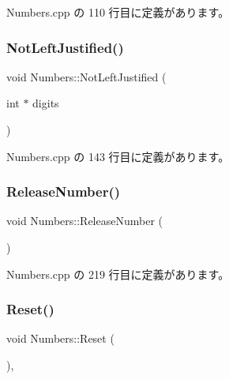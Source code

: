 Numbers.\+cpp の 110 行目に定義があります。

\mbox{\label{class_numbers_a1aaad1f057da0064766bfd25d57caa17}} 
\subsubsection{\texorpdfstring{Not\+Left\+Justified()}{NotLeftJustified()}}
{\footnotesize\ttfamily void Numbers\+::\+Not\+Left\+Justified (\begin{DoxyParamCaption}\item[{int $\ast$}]{digits }\end{DoxyParamCaption})\hspace{0.3cm}{\ttfamily [private]}}



 Numbers.\+cpp の 143 行目に定義があります。

\mbox{\label{class_numbers_a1eb0843ca2449c52e21c84b96bfa4dc5}} 
\subsubsection{\texorpdfstring{Release\+Number()}{ReleaseNumber()}}
{\footnotesize\ttfamily void Numbers\+::\+Release\+Number (\begin{DoxyParamCaption}{ }\end{DoxyParamCaption})\hspace{0.3cm}{\ttfamily [private]}}



 Numbers.\+cpp の 219 行目に定義があります。

\mbox{\label{class_numbers_a1ab67e439ba1695c8fd545dfc1650990}} 
\subsubsection{\texorpdfstring{Reset()}{Reset()}}
{\footnotesize\ttfamily void Numbers\+::\+Reset (\begin{DoxyParamCaption}{ }\end{DoxyParamCaption})\hspace{0.3cm}{\ttfamily [override]}, {\ttfamily [virtual]}}




